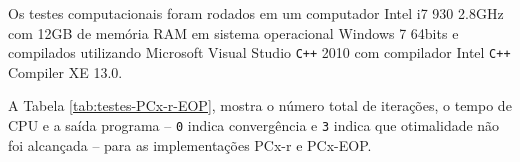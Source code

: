 
Os testes computacionais foram rodados em um computador Intel i7 930 2.8GHz com \num{12}GB de memória RAM em sistema operacional Windows 7 \num{64}bits e compilados utilizando Microsoft Visual Studio \texttt{C++} 2010 com compilador Intel \texttt{C++} Compiler  XE 13.0.

A Tabela \ref{tab:testes-PCx-r-EOP}, mostra o número total de iterações, o tempo de CPU e a saída programa -- \texttt{0} indica convergência e \texttt{3} indica que otimalidade não foi alcançada -- para as implementações PCx-r e PCx-EOP. 









